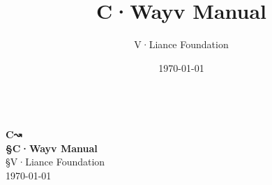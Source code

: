 \documentclass[fontsize=13pt,oneside]{cwayv}
\renewcommand{\maketitle}{
   \begin{titlepage}
     \setcounter{page}{-1}
			\begin{center}
				~\\[7cm]
				{\huge \bfseries {\T C↝ }}\\[1.5cm]
				{\huge \bfseries {\S C·Wayv Manual}}\\[8cm]
				{\S V·Liance Foundation}\\
				\today
			\end{center}
   \end{titlepage}
}
\begin{document}
\title{C·Wayv Manual}
\author{V·Liance Foundation}
\date{\today}
\maketitle


\clearpage
\todototoc
\listoftodos
\clearpage

\clearpage
\tableofcontents
\clearpage



%
%
%
%
%

%
%
%

%

%
%
%
\end{document}
